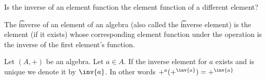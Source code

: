 


Is the inverse of an element function the element function of a different element?


The \t{inverse} of an element of an algebra (also called the \t{inverse element}) is the element (if it exists) whose corresponding element function under the operation is the inverse of the first element's function.


Let $(A, +)$ be an algebra.
Let $a \in A$.
If the inverse element for $a$ exists and is unique we denote it by $\inv{a}$.
In other words $+^a(+^{\inv{a}}) = +^{\inv{a}}$
